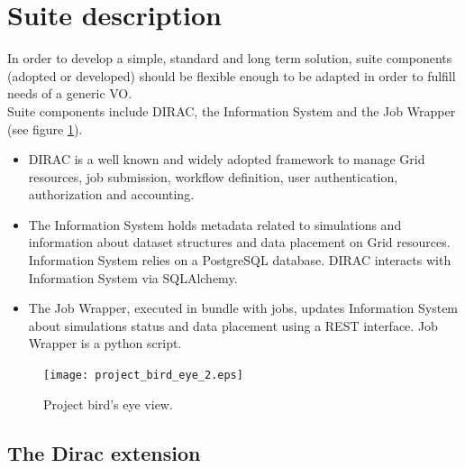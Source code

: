 \documentclass[journal]{IEEEtran}
\begin{document}
\section{Suite description}

In order to develop a simple, standard and long term solution, suite components (adopted or developed) should be flexible enough to be adapted in order to fulfill needs of a generic VO.\\
Suite components include DIRAC\cite{ref:dirac}, the Information System and the Job Wrapper (see figure \ref{fig:project_bird_eye}).\\
\begin{itemize}
\item DIRAC is a well known and widely adopted framework to manage Grid resources, job submission, workflow definition, user authentication, authorization and accounting.
\item The Information System holds metadata related to simulations and information about dataset structures and data placement on Grid resources. Information System relies on a PostgreSQL\cite{ref:postgres} database. DIRAC interacts with Information System via SQLAlchemy\cite{ref:sqlalchemy}.
\item The Job Wrapper, executed in bundle with jobs, updates Information System about simulations status and data placement using a REST interface. Job Wrapper is a python script.
\end{itemize}

\begin{figure}[!t]
\centering
\texttt{[image: project\_bird\_eye\_2.eps]}
\caption{Project bird's eye view.}
\label{fig:project_bird_eye}
\end{figure}

\subsection{The Dirac extension}
\end{document}
